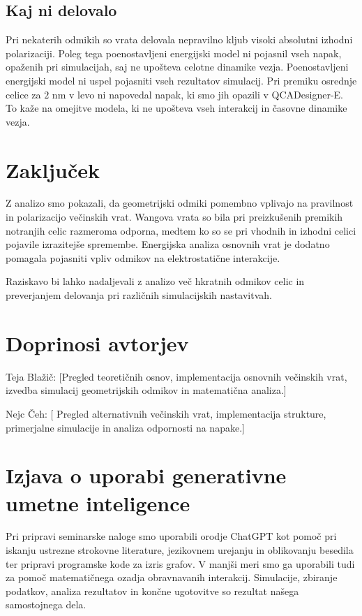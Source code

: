 \documentclass[12pt,a4paper]{article}
\begin{document}
\subsection{Kaj ni delovalo}
\label{g18:sec:neuspehi}

Pri nekaterih odmikih so vrata delovala nepravilno kljub visoki absolutni izhodni polarizaciji.
Poleg tega poenostavljeni energijski model ni pojasnil vseh napak, opaženih pri simulacijah, saj ne upošteva celotne dinamike vezja.
Poenostavljeni energijski model ni uspel pojasniti vseh rezultatov simulacij. Pri premiku osrednje celice za $2$ nm v levo ni napovedal napak, ki smo jih opazili v QCADesigner-E. To kaže na omejitve modela, ki ne upošteva vseh interakcij in časovne dinamike vezja.

\section{Zaključek}
\label{g18:sec:zakljucek}

Z analizo smo pokazali, da geometrijski odmiki pomembno vplivajo na pravilnost in polarizacijo večinskih vrat.
Wangova vrata so bila pri preizkušenih premikih notranjih celic razmeroma odporna, medtem ko so se pri vhodnih in izhodni celici pojavile izrazitejše spremembe.
Energijska analiza osnovnih vrat je dodatno pomagala pojasniti vpliv odmikov na elektrostatične interakcije.

Raziskavo bi lahko nadaljevali z analizo več hkratnih odmikov celic in preverjanjem delovanja pri različnih simulacijskih nastavitvah.


\section*{Doprinosi avtorjev}

Teja Blažič: [Pregled teoretičnih osnov, implementacija osnovnih večinskih vrat, izvedba simulacij geometrijskih odmikov in matematična analiza.]

Nejc Čeh: [ Pregled alternativnih večinskih vrat, implementacija strukture, primerjalne simulacije in analiza odpornosti na napake.]


\section*{Izjava o uporabi generativne umetne inteligence}

Pri pripravi seminarske naloge smo uporabili orodje ChatGPT kot pomoč pri iskanju ustrezne strokovne literature,
jezikovnem urejanju in oblikovanju besedila ter pripravi programske kode za izris grafov. V manjši meri smo ga
uporabili tudi za pomoč matematičnega ozadja obravnavanih interakcij.
Simulacije, zbiranje podatkov, analiza rezultatov in končne ugotovitve so rezultat našega samostojnega dela.
\end{document}

